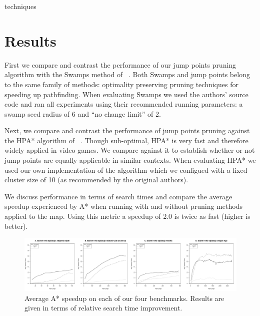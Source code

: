 techniques\section{Results}
First we compare and contrast the performance of our jump points
pruning algorithm with the Swamps method of
\citeauthor{pochter10}~. 
Both Swamps and jump points belong to the same family of methods:
optimality preserving pruning techniques for speeding up pathfinding.
When evaluating Swamps we used the authors'
source code and ran all experiments using their recommended running parameters:
a swamp seed radius of 6 and ``no change limit'' of 2. 
\par
Next, we compare and contrast the performance of jump points pruning 
against the HPA* algorithm of \citeauthor{botea04}~.
Though sub-optimal, HPA* is very fast and therefore widely applied in video
games. We compare against it to establish whether or not jump points are 
equally applicable in similar contexts. 
When evaluating HPA* we used our own implementation of the algorithm which we 
configued with a fixed cluster size of 10 (as recommended by the original authors).
\par
We discuss performance in terms of search times and compare 
the average speedup experienced by A* when running with and
without pruning methods applied to the map.  
Using this metric a speedup of 2.0 is twice as fast (higher is better).

\begin{figure}[t]
   \begin{center}
	   \includegraphics[width=2.0\columnwidth, trim = 10mm 10mm 10mm 0mm]
		{diagrams/speedup.pdf}
   \end{center}
   \caption{Average A* speedup on each of our four benchmarks. 
	Results are given in terms of relative search time improvement.}
\label{fig:speedup}
\end{figure}

